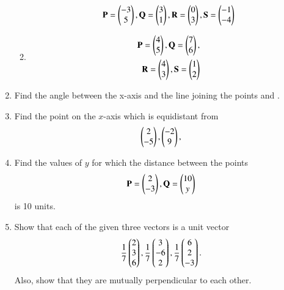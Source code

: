\begin{enumerate}[label=\arabic*.,ref=\thesubsection.\theenumi]
\begin{enumerate}
\begin{align}
\mathbf{P} = \begin{pmatrix}-3\\5\end{pmatrix}, \mathbf{Q} =\begin{pmatrix}3\\1\end{pmatrix},
\mathbf{R} =\begin{pmatrix}0\\3\end{pmatrix}, \mathbf{S} =\begin{pmatrix}-1\\-4\end{pmatrix}
\end{align}
\item 
\begin{align}
\mathbf{P} = \begin{pmatrix}4\\5\end{pmatrix}, \mathbf{Q} =\begin{pmatrix}7\\6\end{pmatrix},
\\
\mathbf{R} =\begin{pmatrix}4\\3\end{pmatrix}, \mathbf{S} =\begin{pmatrix}1\\2\end{pmatrix}
\end{align}
\end{enumerate}
\solution

\item Find the angle between the x-axis and the line joining the points  and .
\solution

\item Find the point on the $x$-axis which is equidistant from 
\begin{align}
\begin{pmatrix}2\\-5\end{pmatrix}, \begin{pmatrix}-2\\9\end{pmatrix},
\end{align}
\solution

\item Find the values of $y$ for which the distance between the points 
\begin{align}
\mathbf{P} = \begin{pmatrix}2\\-3\end{pmatrix}, \mathbf{Q} = \begin{pmatrix}10\\y\end{pmatrix}
\end{align}
is 10 units.
\solution

\item Show that each of the given three vectors is a unit vector
\begin{align}
 \frac{1}{7}\begin{pmatrix}2\\3\\6\end{pmatrix}, \frac{1}{7}\begin{pmatrix}3\\-6\\2\end{pmatrix}, \frac{1}{7}\begin{pmatrix}6\\2\\-3\end{pmatrix}.
\end{align}
Also,  show that they are mutually perpendicular to each other.
\\
\solution 



\end{enumerate}
